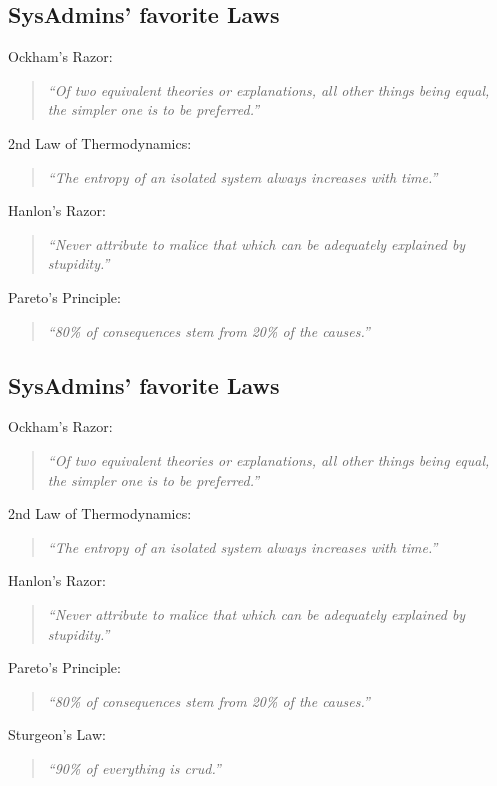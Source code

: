 \documentclass[xga]{xdvislides}
\newcommand{\smallish}{\fontsize{18}{18}\selectfont}
\begin{document}
\subsection{SysAdmins' favorite Laws}
\smallish
Ockham's Razor:
\begin{quote}
{\em ``Of two equivalent theories or explanations, all other things being
equal, the simpler one is to be preferred.''}
\end{quote}

2nd Law of Thermodynamics:
\begin{quote}
{\em ``The entropy of an isolated system always increases with time.''}
\end{quote}

Hanlon's Razor:
\begin{quote}
{\em ``Never attribute to malice that which can be adequately explained by
stupidity.''}
\end{quote}

Pareto's Principle:
\begin{quote}
{\em ``80\% of consequences stem from 20\% of the causes.''}
\end{quote}
\Normalsize

\subsection{SysAdmins' favorite Laws}
\smallish
Ockham's Razor:
\begin{quote}
{\em ``Of two equivalent theories or explanations, all other things being
equal, the simpler one is to be preferred.''}
\end{quote}

2nd Law of Thermodynamics:
\begin{quote}
{\em ``The entropy of an isolated system always increases with time.''}
\end{quote}

Hanlon's Razor:
\begin{quote}
{\em ``Never attribute to malice that which can be adequately explained by
stupidity.''}
\end{quote}

Pareto's Principle:
\begin{quote}
{\em ``80\% of consequences stem from 20\% of the causes.''}
\end{quote}

Sturgeon's Law:
\begin{quote}
{\em ``90\% of everything is crud.''}
\end{quote}
\Normalsize
\end{document}
